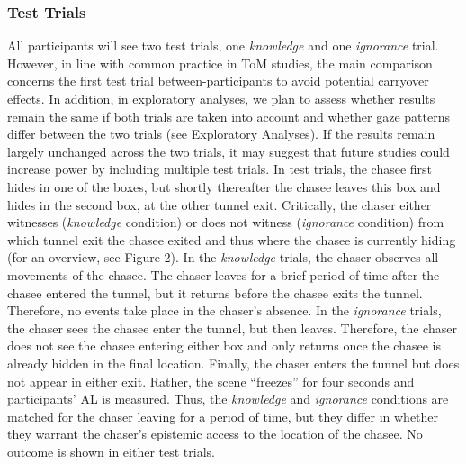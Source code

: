 \documentclass[
  man,floatsintext]{apa6}
\begin{document}
\subsubsection{Test Trials}\label{test-trials}

All participants will see two test trials, one \emph{knowledge} and one \emph{ignorance} trial. However, in line with common practice in ToM studies, the main comparison concerns the first test trial between-participants to avoid potential carryover effects. In addition, in exploratory analyses, we plan to assess whether results remain the same if both trials are taken into account and whether gaze patterns differ between the two trials (see Exploratory Analyses). If the results remain largely unchanged across the two trials, it may suggest that future studies could increase power by including multiple test trials.
In test trials, the chasee first hides in one of the boxes, but shortly thereafter the chasee leaves this box and hides in the second box, at the other tunnel exit. Critically, the chaser either witnesses (\emph{knowledge} condition) or does not witness (\emph{ignorance} condition) from which tunnel exit the chasee exited and thus where the chasee is currently hiding (for an overview, see Figure 2). In the \emph{knowledge} trials, the chaser observes all movements of the chasee. The chaser leaves for a brief period of time after the chasee entered the tunnel, but it returns before the chasee exits the tunnel. Therefore, no events take place in the chaser's absence. In the \emph{ignorance} trials, the chaser sees the chasee enter the tunnel, but then leaves. Therefore, the chaser does not see the chasee entering either box and only returns once the chasee is already hidden in the final location. Finally, the chaser enters the tunnel but does not appear in either exit. Rather, the scene ``freezes'' for four seconds and participants' AL is measured. Thus, the \emph{knowledge} and \emph{ignorance} conditions are matched for the chaser leaving for a period of time, but they differ in whether they warrant the chaser's epistemic access to the location of the chasee. No outcome is shown in either test trials.
\end{document}
